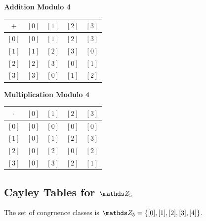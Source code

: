 \documentclass[10pt]{article}
\theoremstyle{definition}
\theoremstyle{plain}
\numberwithin{equation}{section}
\begin{document}
\vspace{1em}
\noindent
\begin{minipage}{0.45\textwidth}
  \centering
  \textbf{Addition Modulo 4}
  \vspace{0.5em}
  \begin{tabular}{|c||c|c|c|c|}
    \hline
    $+$ & $[0]$ & $[1]$ & $[2]$ & $[3]$ \\
    \hline\hline
    $[0]$ & $[0]$ & $[1]$ & $[2]$ & $[3]$ \\
    \hline
    $[1]$ & $[1]$ & $[2]$ & $[3]$ & $[0]$ \\
    \hline
    $[2]$ & $[2]$ & $[3]$ & $[0]$ & $[1]$ \\
    \hline
    $[3]$ & $[3]$ & $[0]$ & $[1]$ & $[2]$ \\
    \hline
  \end{tabular}
\end{minipage}
\hfill
\begin{minipage}{0.45\textwidth}
  \centering
  \textbf{Multiplication Modulo 4}
  \vspace{0.5em}
  \begin{tabular}{|c||c|c|c|c|}
    \hline
    $\cdot$ & $[0]$ & $[1]$ & $[2]$ & $[3]$ \\
    \hline\hline
    $[0]$ & $[0]$ & $[0]$ & $[0]$ & $[0]$ \\
    \hline
    $[1]$ & $[0]$ & $[1]$ & $[2]$ & $[3]$ \\
    \hline
    $[2]$ & $[0]$ & $[2]$ & $[0]$ & $[2]$ \\
    \hline
    $[3]$ & $[0]$ & $[3]$ & $[2]$ & $[1]$ \\
    \hline
  \end{tabular}
\end{minipage}
\vspace{2em}


\subsection*{Cayley Tables for $\setZ_5$}
The set of congruence classes is $\setZ_5 = \{[0], [1], [2], [3], [4]\}$.
\end{document}
